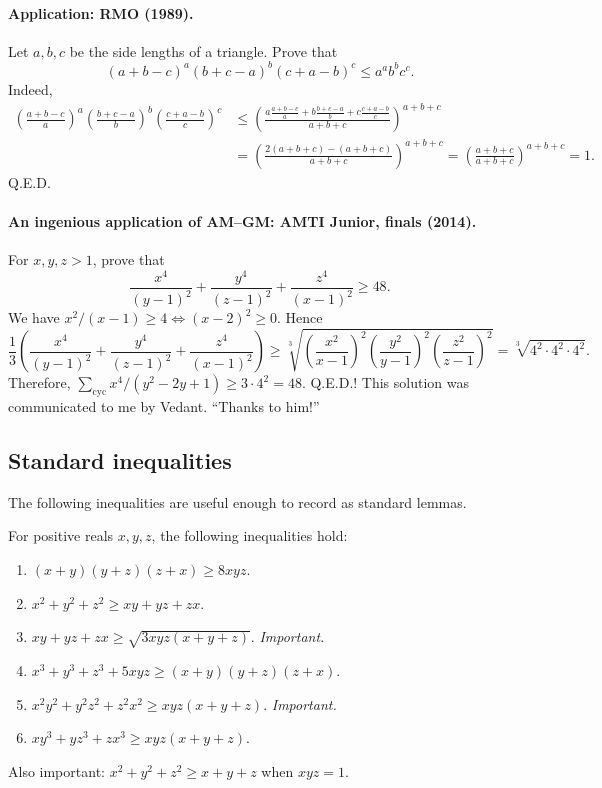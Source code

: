 \documentclass[11pt,a4paper]{article}
\begin{document}
\paragraph{Application: RMO (1989).}
Let $a,b,c$ be the side lengths of a triangle. Prove that
\[(a+b-c)^a(b+c-a)^b(c+a-b)^c\leq a^ab^bc^c.\]
Indeed,
\[
\begin{aligned}
\left(\frac{a+b-c}{a}\right)^a
\left(\frac{b+c-a}{b}\right)^b
\left(\frac{c+a-b}{c}\right)^c
&\leq\left(\frac{a\frac{a+b-c}{a}+b\frac{b+c-a}{b}+c\frac{c+a-b}{c}}{a+b+c}\right)^{a+b+c}\\
&=\left(\frac{2(a+b+c)-(a+b+c)}{a+b+c}\right)^{a+b+c}
=\left(\frac{a+b+c}{a+b+c}\right)^{a+b+c}=1.
\end{aligned}
\]
Q.E.D.
\paragraph{An ingenious application of AM--GM: AMTI Junior, finals (2014).}
For $x,y,z>1$, prove that
\[\frac{x^4}{(y-1)^2}+\frac{y^4}{(z-1)^2}+\frac{z^4}{(x-1)^2}\geq48.\]
We have $x^2/(x-1)\geq4\Longleftrightarrow(x-2)^2\geq0$. Hence
\[
\frac13\left(\frac{x^4}{(y-1)^2}+\frac{y^4}{(z-1)^2}+\frac{z^4}{(x-1)^2}\right)
\geq\sqrt[3]{\left(\frac{x^2}{x-1}\right)^2
\left(\frac{y^2}{y-1}\right)^2\left(\frac{z^2}{z-1}\right)^2}
=\sqrt[3]{4^2\cdot4^2\cdot4^2}.
\]
Therefore, $\sum_{\mathrm{cyc}}x^4/(y^2-2y+1)\geq3\cdot4^2=48$. Q.E.D.!
This solution was communicated to me by Vedant. ``Thanks to him!''

\subsection{Standard inequalities}
The following inequalities are useful enough to record as standard lemmas.
\setcounter{theorem}{72}\begin{lemma}\label{lemma:lb1-76}
For positive reals $x,y,z$, the following inequalities hold:
\begin{enumerate}
\setcounter{enumi}{0}\item $(x+y)(y+z)(z+x)\geq8xyz$.
\setcounter{enumi}{1}\item $x^2+y^2+z^2\geq xy+yz+zx$.
\setcounter{enumi}{2}\item $xy+yz+zx\geq\sqrt{3xyz(x+y+z)}$. \emph{Important.}
\setcounter{enumi}{3}\item $x^3+y^3+z^3+5xyz\geq(x+y)(y+z)(z+x)$.
\setcounter{enumi}{4}\item $x^2y^2+y^2z^2+z^2x^2\geq xyz(x+y+z)$. \emph{Important.}
\setcounter{enumi}{5}\item $xy^3+yz^3+zx^3\geq xyz(x+y+z)$.
\end{enumerate}
Also important: $x^2+y^2+z^2\geq x+y+z$ when $xyz=1$.
\end{lemma}
\end{document}
